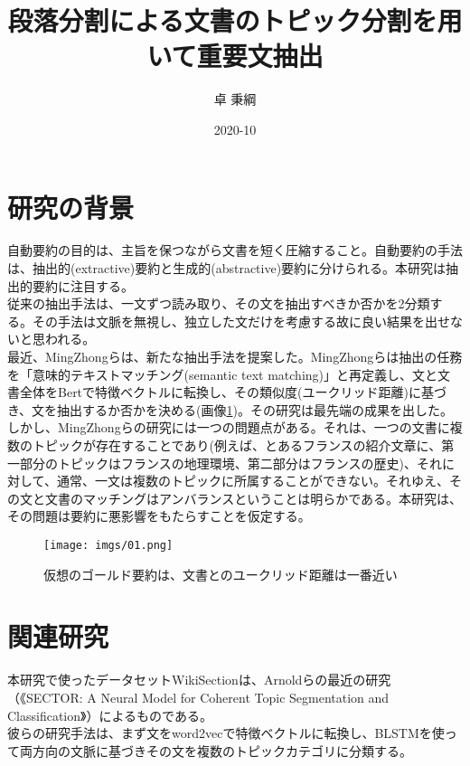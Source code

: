 \documentclass[a4paper]{article}
\title{段落分割による文書のトピック分割を用いて重要文抽出}
\date{2020-10}
\author{卓 秉綱}
\begin{document}
\maketitle

\section{研究の背景}

自動要約の目的は、主旨を保つながら文書を短く圧縮すること。自動要約の手法は、抽出的(extractive)要約と生成的(abstractive)要約に分けられる。本研究は抽出的要約に注目する。\\

従来の抽出手法は、一文ずつ読み取り、その文を抽出すべきか否かを2分類する。その手法は文脈を無視し、独立した文だけを考慮する故に良い結果を出せないと思われる。\\

最近、MingZhongらは、新たな抽出手法を提案した。MingZhongらは抽出の任務を「意味的テキストマッチング(semantic text matching)」と再定義し、文と文書全体をBertで特徴ベクトルに転換し、その類似度(ユークリッド距離)に基づき、文を抽出するか否かを決める(画像\ref{fig:img1})。その研究は最先端の成果を出した。\\

しかし、MingZhongらの研究には一つの問題点がある。それは、一つの文書に複数のトピックが存在することであり(例えば、とあるフランスの紹介文章に、第一部分のトピックはフランスの地理環境、第二部分はフランスの歴史)、それに対して、通常、一文は複数のトピックに所属することができない。それゆえ、その文と文書のマッチングはアンバランスということは明らかである。本研究は、その問題は要約に悪影響をもたらすことを仮定する。\\

\begin{figure}
  \texttt{[image: imgs/01.png]}
  \caption{仮想のゴールド要約は、文書とのユークリッド距離は一番近い}
  \label{fig:img1}
\end{figure}

\section{関連研究}

本研究で使ったデータセットWikiSectionは、Arnoldらの最近の研究（《SECTOR: A Neural Model for Coherent Topic Segmentation and Classification》）によるものである。\\

彼らの研究手法は、まず文をword2vecで特徴ベクトルに転換し、BLSTMを使って両方向の文脈に基づきその文を複数のトピックカテゴリに分類する。\\
\end{document}
